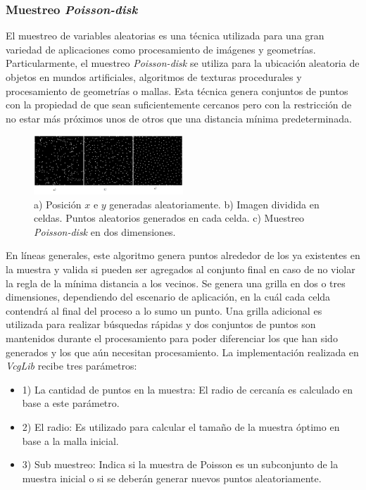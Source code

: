 \subsubsection{Muestreo \emph{Poisson-disk}}

El muestreo de variables aleatorias es una técnica utilizada para una gran variedad de aplicaciones como procesamiento de imágenes y geometrías. Particularmente, el muestreo \emph{Poisson-disk} se utiliza para la ubicación aleatoria de objetos en mundos artificiales, algoritmos de texturas procedurales y procesamiento de geometrías o mallas. Esta técnica genera conjuntos de puntos con la propiedad de que sean suficientemente cercanos pero con la restricción de no estar más próximos unos de otros que una distancia mínima predeterminada.

\begin{figure}[H]
  \centering
    \includegraphics[width=0.5\textwidth]{./Cap2_videomapping/malla-poisson.png}
  \caption[http://www.cgal.org]{a) Posición $x$ e $y$ generadas aleatoriamente. b) Imagen dividida en celdas. Puntos aleatorios generados en cada celda. c) Muestreo \emph{Poisson-disk} en dos dimensiones.}
  \label{fig:Mesh-Poisson}
\end{figure}

En líneas generales, este algoritmo genera puntos alrededor de los ya existentes en la muestra y valida si pueden ser agregados al conjunto final en caso de no violar la regla de la mínima distancia a los vecinos. Se genera una grilla en dos o tres dimensiones, dependiendo del escenario de aplicación, en la cuál cada celda contendrá al final del proceso a lo sumo un punto. Una grilla adicional es utilizada para realizar búsquedas rápidas y dos conjuntos de puntos son mantenidos durante el procesamiento para poder diferenciar los que han sido generados y los que aún necesitan procesamiento.
La implementación realizada en \emph{VcgLib} recibe tres parámetros:
\begin{itemize}
  \item 1) La cantidad de puntos en la muestra: El radio de cercanía es calculado en base a este parámetro.
  \item 2) El radio: Es utilizado para calcular el tamaño de la muestra óptimo en base a la malla inicial.
  \item 3) Sub muestreo: Indica si la muestra de Poisson es un subconjunto de la muestra inicial o si se deberán generar nuevos puntos aleatoriamente.
\end{itemize}

